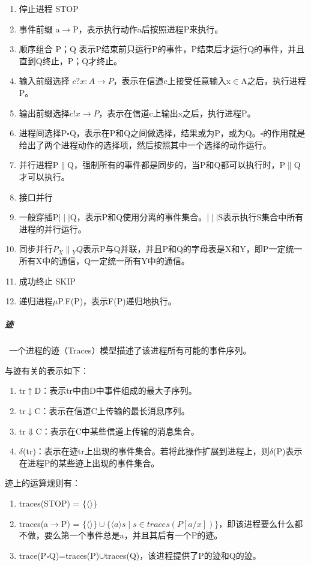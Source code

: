 \documentclass[cs4size,a4pape,UTF8]{ctexart}
\numberwithin{equation}{section}
\numberwithin{table}{section}
\numberwithin{figure}{section}
\begin{document}
\begin{enumerate}[(1)]
\item 停止进程 STOP
\item 事件前缀 a$\rightarrow$P，表示执行动作a后按照进程P来执行。
\item 顺序组合 P；Q  表示P结束前只运行P的事件，P结束后才运行Q的事件，并且直到Q终止，P；Q才终止。
\item 输入前缀选择 $c?x:A\rightarrow{P}$，表示在信道c上接受任意输入x$\in$A之后，执行进程P。
\item 输出前缀选择$c!x\rightarrow{P}$，表示在信道c上输出x之后，执行进程P。
\item 进程间选择P$\square$Q，表示在P和Q之间做选择，结果或为P，或为Q。$\square$的作用就是给出了两个进程动作的选择项，然后按照其中一个选择的动作运行。
\item 并行进程P$\parallel$Q，强制所有的事件都是同步的，当P和Q都可以执行时，P$\parallel$Q才可以执行。
\item 接口并行
\item 一般穿插P$\mid\mid\mid$Q，表示P和Q使用分离的事件集合。$\mid\mid\mid$S表示执行S集合中所有进程的并行运行。
\item 同步并行$P_{X}\parallel$$_{Y}Q$表示P与Q并联，并且P和Q的字母表是X和Y，即P一定统一所有X中的通信，Q一定统一所有Y中的通信。
\item 成功终止 SKIP
\item 递归进程$\mu$P.F(P)，表示F(P)递归地执行。
\end{enumerate}

\subparagraph{迹}\
一个进程的迹（Traces）模型描述了该进程所有可能的事件序列。

与迹有关的表示如下：

\begin{enumerate}[(1)]
\item tr$\uparrow$D：表示tr中由D中事件组成的最大子序列。
\item tr$\downarrow$C：表示在信道C上传输的最长消息序列。
\item tr$\Downarrow$C：表示在C中某些信道上传输的消息集合。
\item $\delta$(tr)：表示在迹tr上出现的事件集合。若将此操作扩展到进程上，则$\delta$(P)表示在进程P的某些迹上出现的事件集合。
\end{enumerate}

迹上的运算规则有：

\begin{enumerate}[(1)]
\item traces(STOP) = $\{\langle\rangle\}$
\item traces(a$\rightarrow$P) = $\{\langle\rangle\}\cup\{\langle{a}\rangle{s}\mid{s}\in{traces(P[a/x])}\}$，即该进程要么什么都不做，要么第一个事件总是a，并且其后有一个P的迹。
\item trace(P$\square$Q)=traces(P)$\cup$traces(Q)，该进程提供了P的迹和Q的迹。
\end{enumerate}
\end{document}
